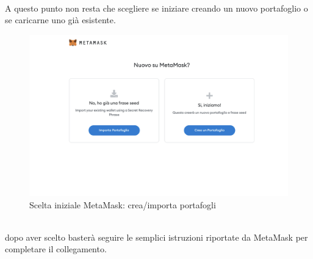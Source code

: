 \textbf{}\\
A questo punto non resta che scegliere se iniziare creando un nuovo portafoglio o se caricarne uno già esistente.

\begin{figure}[H]
    \centering
    \includegraphics[scale=0.3]{immagini/MetaMask/chooseMetamask.png}
    \caption{Scelta iniziale MetaMask: crea/importa portafogli}
\end{figure}

\textbf{}\\
dopo aver scelto basterà seguire le semplici istruzioni riportate da MetaMask per completare il collegamento.

